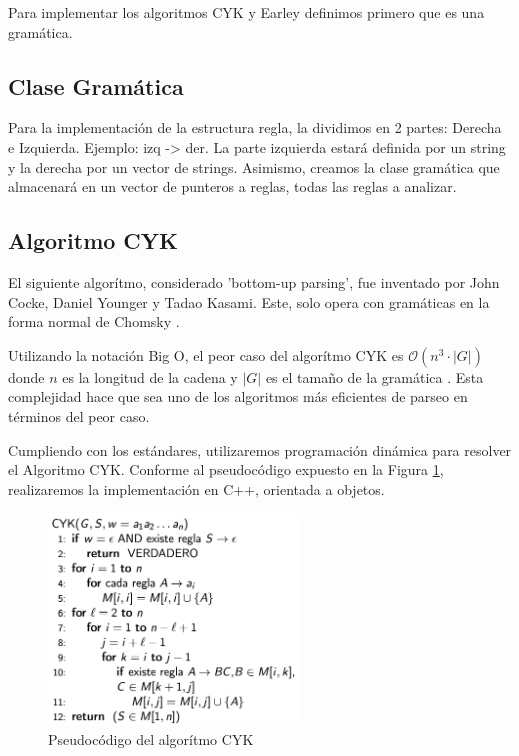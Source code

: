 \documentclass[12pt]{article}
\begin{document}
Para implementar los algoritmos CYK y Earley definimos primero que es una gramática.

\subsection{Clase Gramática}
Para la implementación de la estructura regla, la dividimos en 2 partes: Derecha e Izquierda. Ejemplo: izq -> der. La parte izquierda estará definida por un string y la derecha por un vector de strings. Asimismo, creamos la clase gramática que almacenará en un vector de punteros a reglas, todas las reglas a analizar.


%

\newpage


\subsection{Algoritmo CYK}
El siguiente algorítmo, considerado 'bottom-up parsing', fue inventado por John Cocke, Daniel Younger y Tadao Kasami. Este, solo opera con gramáticas en la forma normal de Chomsky \cite{CYKAlgorithmWiki}. 

Utilizando la notación Big O, el peor caso del algorítmo CYK es  
 ${\displaystyle {\mathcal {O}}\left(n^{3}\cdot \left|G\right|\right)}$ donde ${\displaystyle n}$ es la longitud de la cadena y ${\displaystyle \left|G\right|}$ es el tamaño de la gramática \cite{HopcroftUllman}. Esta complejidad hace que sea uno de los algoritmos más eficientes de parseo en términos del peor caso.

Cumpliendo con los estándares, utilizaremos programación dinámica para resolver el Algoritmo CYK. Conforme al pseudocódigo expuesto en la Figura \ref{fig:pCYK}, realizaremos la implementación en C++, orientada a objetos.

\begin{figure}[h!]
    \centering
    \includegraphics[width=250px]{img/pCYK.png}
    \caption{Pseudocódigo del algorítmo CYK}
    \label{fig:pCYK}
\end{figure} 
\end{document}
